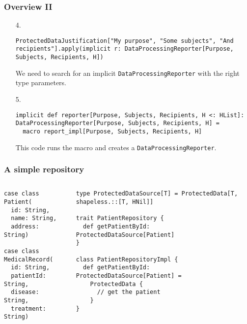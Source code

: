 \documentclass[aspectratio=169]{beamer}
\begin{document}
\begin{frame}[fragile]
\frametitle{Overview II}

\begin{enumerate}
\item[4.]
\begin{lstlisting}[style=myScalastyle,frame=none]
ProtectedDataJustification["My purpose", "Some subjects", "And recipients"].apply(implicit r: DataProcessingReporter[Purpose, Subjects, Recipients, H])
\end{lstlisting}
We need to search for an implicit \texttt{DataProcessingReporter} with the right type parameters.
\item[5.]

\begin{lstlisting}[style=myScalastyle,frame=none]
  implicit def reporter[Purpose, Subjects, Recipients, H <: HList]: DataProcessingReporter[Purpose, Subjects, Recipients, H] =
  macro report_impl[Purpose, Subjects, Recipients, H]
\end{lstlisting}
This code runs the macro and creates a \texttt{DataProcessingReporter}.
\end{enumerate}
\end{frame}

\begin{frame}[fragile]
\frametitle{A simple repository}

\begin{columns}
\begin{column}{0.3\textwidth}

\begin{lstlisting}[style=myScalastyle,frame=none]
case class Patient(
  id: String,
  name: String,
  address: String)
  
case class MedicalRecord(
  id: String,
  patientId: String,
  disease: String,
  treatment: String)
\end{lstlisting}


\end{column}
\pause
\vrule
\begin{column}{0.7\textwidth}  

\begin{lstlisting}[style=myScalastyle,frame=none]
type ProtectedDataSource[T] = ProtectedData[T, shapeless.::[T, HNil]]  

trait PatientRepository {
  def getPatientById: ProtectedDataSource[Patient]
}

class PatientRepositoryImpl {
  def getPatientById: ProtectedDataSource[Patient] =
    ProtectedData {
      // get the patient
    }
}

\end{lstlisting}


\end{column}
\end{columns}

\end{frame}
\end{document}
